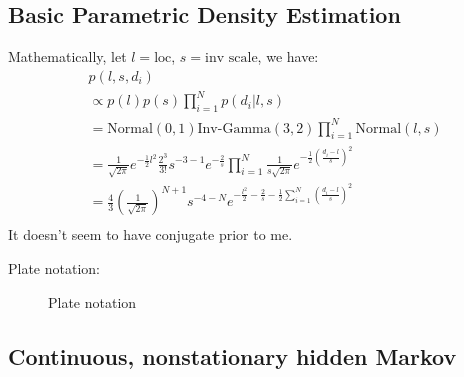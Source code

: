 \subsection{Basic Parametric Density Estimation}
Mathematically, let $l=\text{loc}$, $s=\text{inv scale}$, we have:
\begin{align*}
     & p(l, s, d_i)                                                                                                                                                \\
     & \propto p(l)p(s)\prod_{i=1}^N p(d_i|l,s)                                                                                                                    \\
     & = \text{Normal}(0,1) \text{Inv-Gamma}(3,2) \prod_{i=1}^N \text{Normal}(l, s)                                                                                \\
     & = \frac{1}{\sqrt{2\pi}}e^{-\frac{1}{2}l^2} \frac{2^3}{3!}s^{-3-1} e^{-\frac{2}{s}} \prod_{i=1}^N \frac{1}{s\sqrt{2\pi}} e^{-\frac{1}{2}(\frac{d_i-l}{s})^2} \\
     & = \frac{4}{3} (\frac{1}{\sqrt{2\pi}})^{N+1} s^{-4-N} e^{-\frac{l^2}{2} -\frac{2}{s} - \frac{1}{2}\sum_{i=1}^N (\frac{d_i-l}{s})^2}                          \\
\end{align*}
It doesn't seem to have conjugate prior to me.

Plate notation:
\begin{figure}[h]
    \centering
    \caption{Plate notation}
\end{figure}

\newpage
\subsection{Continuous, nonstationary hidden Markov}

